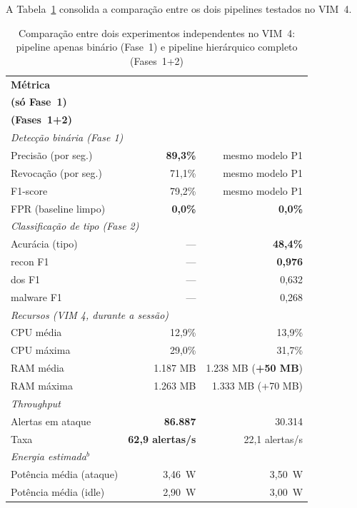 \documentclass[12pt]{article}
\begin{document}
A Tabela~\ref{tab:comparison} consolida a comparação entre os dois pipelines
testados no VIM~4.

\begin{table}[ht]
\centering
\caption{Comparação entre dois experimentos independentes no VIM~4: pipeline apenas binário (Fase~1) e pipeline hierárquico completo (Fases~1+2)}
\label{tab:comparison}
\begin{tabular}{@{}lrr@{}}
\toprule
\textbf{Métrica} & \shortstack[r]{\textbf{IDS Binário}\\ \textbf{(só Fase~1)}}
                 & \shortstack[r]{\textbf{IDS Multiclasse}\\ \textbf{(Fases~1+2)}} \\ \midrule
\multicolumn{3}{l}{\textit{Detecção binária (Fase 1)}} \\
\quad Precisão (por seg.) & \textbf{89,3\%} & mesmo modelo P1 \\
\quad Revocação (por seg.) & 71,1\%         & mesmo modelo P1 \\
\quad F1-score            & 79,2\%          & mesmo modelo P1 \\
\quad FPR (baseline limpo) & \textbf{0,0\%} & \textbf{0,0\%} \\ \midrule
\multicolumn{3}{l}{\textit{Classificação de tipo (Fase 2)}} \\
\quad Acurácia (tipo)   & —               & \textbf{48,4\%} \\
\quad recon F1          & —               & \textbf{0,976} \\
\quad dos F1            & —               & 0,632 \\
\quad malware F1        & —               & 0,268 \\
\midrule
\multicolumn{3}{l}{\textit{Recursos (VIM 4, durante a sessão)}} \\
\quad CPU média         & 12,9\%          & 13,9\% \\
\quad CPU máxima        & 29,0\%          & 31,7\% \\
\quad RAM média         & 1.187 MB        & 1.238 MB (\textbf{+50 MB}) \\
\quad RAM máxima        & 1.263 MB        & 1.333 MB (+70 MB) \\ \midrule
\multicolumn{3}{l}{\textit{Throughput}} \\
\quad Alertas em ataque & \textbf{86.887}  & 30.314 \\
\quad Taxa              & \textbf{62,9 alertas/s} & 22,1 alertas/s \\ \midrule
\multicolumn{3}{l}{\textit{Energia estimada$^{b}$}} \\
\quad Potência média (ataque) & 3,46~W & 3,50~W \\
\quad Potência média (idle)   & 2,90~W & 3,00~W \\
\bottomrule
\end{tabular}
\end{table}
\end{document}
